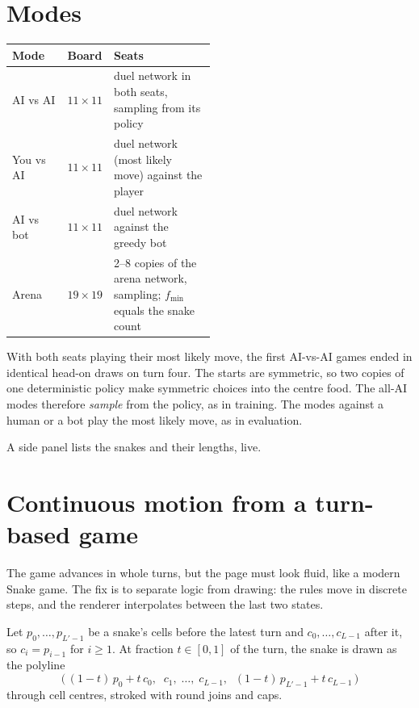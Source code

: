 \section{Modes}

\begin{center}
\begin{tabular}{@{}llp{0.5\linewidth}@{}}
\toprule
\textbf{Mode} & \textbf{Board} & \textbf{Seats}\\
\midrule
AI vs AI & $11\times11$ & duel network in both seats, sampling from its policy\\
You vs AI & $11\times11$ & duel network (most likely move) against the player\\
AI vs bot & $11\times11$ & duel network against the greedy bot\\
Arena & $19\times19$ & 2--8 copies of the arena network, sampling; $f_{\min}$ equals the snake count\\
\bottomrule
\end{tabular}
\end{center}

\begin{warnbox}
With both seats playing their most likely move, the first AI-vs-AI games ended in
identical head-on draws on turn four. The starts are symmetric, so two copies of one
deterministic policy make symmetric choices into the centre food. The all-AI modes
therefore \emph{sample} from the policy, as in training. The modes against a human or a
bot play the most likely move, as in evaluation.
\end{warnbox}

A side panel lists the snakes and their lengths, live.

\section{Continuous motion from a turn-based game}

The game advances in whole turns, but the page must look fluid, like a modern Snake
game. The fix is to separate logic from drawing: the rules move in discrete steps, and
the renderer interpolates between the last two states.

\begin{defbox}
Let $p_0,\dots,p_{L'-1}$ be a snake's cells before the latest turn and $c_0,\dots,c_{L-1}$
after it, so $c_i=p_{i-1}$ for $i\ge1$. At fraction $t\in[0,1]$ of the turn, the snake is
drawn as the polyline
\[
  \bigl(\,(1-t)\,p_0 + t\,c_0,\;\; c_1,\;\dots,\;c_{L-1},\;\; (1-t)\,p_{L'-1} + t\,c_{L-1}\,\bigr)
\]
through cell centres, stroked with round joins and caps.
\end{defbox}

